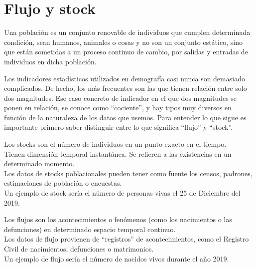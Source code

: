 \section{Flujo y stock}
\begin{Def}
    Una población es un conjunto renovable de individuos que cumplen determinada condición, sean humanos, animales o cosas y no son un conjunto estático, sino que están sometidas a un proceso continuo de cambio, por salidas y entradas de individuos en dicha población.
\end{Def}
Los indicadores estadísticos utilizados en demografía casi nunca son demasiado complicados. De hecho, los más frecuentes son las que tienen relación entre solo dos magnitudes. Ese caso concreto de indicador en el que dos magnitudes se ponen en relación, se conoce como “cociente”, y hay tipos muy diversos en función de la naturaleza de los datos que usemos. Para entender lo que sigue es importante primero saber distinguir entre lo que significa “flujo” y “stock”.
\begin{Def}
    Los stocks son el número de individuos en un punto exacto en el tiempo.\\
    Tienen dimensión temporal instantánea. Se refieren a las existencias en un determinado momento.\\
    Los datos de stocks poblacionales pueden tener como fuente los censos, padrones, estimaciones de población o encuestas.\\
    Un ejemplo de stock sería el número de personas vivas el 25 de Diciembre del 2019.
\end{Def}
\begin{Def}
    Los flujos son los acontecimientos o fenómenos (como los nacimientos o las defunciones) en determinado espacio temporal continuo.\\Los datos de flujo provienen de “registros” de acontecimientos, como el Registro Civil de nacimientos, defunciones o matrimonios.\\
    Un ejemplo de flujo sería el número de nacidos vivos durante el año 2019.
\end{Def}
